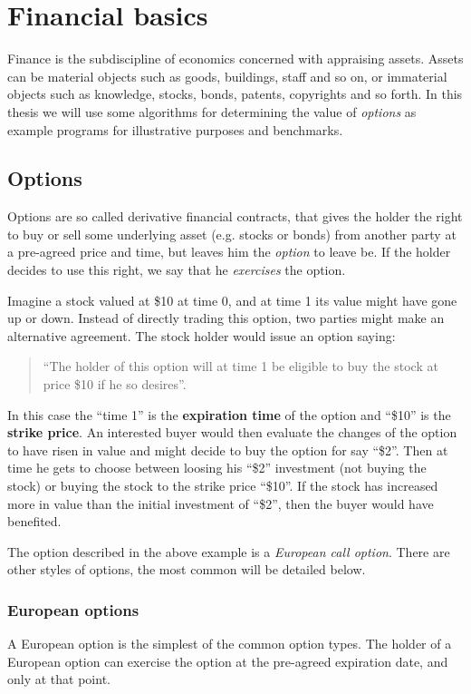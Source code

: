 \chapter{Financial basics}

Finance is the subdiscipline of economics concerned with appraising
assets. Assets can be material objects such as goods, buildings, staff
and so on, or immaterial objects such as knowledge, stocks, bonds,
patents, copyrights and so forth. In this thesis we will use some
algorithms for determining the value of \textit{options} as example
programs for illustrative purposes and benchmarks.

\section{Options}
Options are so called derivative financial contracts, that gives the
holder the right to buy or sell some underlying asset (e.g. stocks or
bonds) from another party at a pre-agreed price and time, but leaves
him the \textit{option} to leave be. If the holder decides to use this
right, we say that he \textit{exercises} the option. 

\begin{example}
  Imagine a stock valued at \$10 at time 0, and at time 1 its value
  might have gone up or down. Instead of directly trading this option,
  two parties might make an alternative agreement. The stock holder
  would issue an option saying:
  \begin{quotation}
    ``The holder of this option will at time 1 be eligible to buy the
    stock at price \$10 if he so desires''.
  \end{quotation}
  In this case the ``time 1'' is the \textbf{expiration time} of the
  option and ``\$10'' is the \textbf{strike price}. An interested
  buyer would then evaluate the changes of the option to have risen in
  value and might decide to buy the option for say ``\$2''. Then at
  time he gets to choose between loosing his ``\$2'' investment (not
  buying the stock) or buying the stock to the strike price
  ``\$10''. If the stock has increased more in value than the initial
  investment of ``\$2'', then the buyer would have benefited.
\end{example}
The option described in the above example is a \textit{European call
  option}.  There are other styles of options, the most common will be
detailed below.

\subsection{European options}
A European option is the simplest of the common option types. The
holder of a European option can exercise the option at the pre-agreed
expiration date, and only at that point. 

